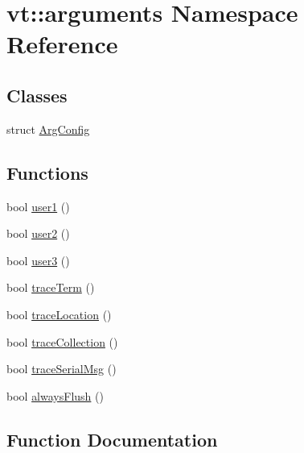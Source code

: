 \hypertarget{namespacevt_1_1arguments}{}\section{vt\+:\+:arguments Namespace Reference}
\label{namespacevt_1_1arguments}
\subsection*{Classes}
\begin{DoxyCompactItemize}
\item 
struct \hyperlink{structvt_1_1arguments_1_1_arg_config}{Arg\+Config}
\end{DoxyCompactItemize}
\subsection*{Functions}
\begin{DoxyCompactItemize}
\item 
bool \hyperlink{namespacevt_1_1arguments_afe229ddf0b473e54fac5ff6884b07ad0}{user1} ()
\item 
bool \hyperlink{namespacevt_1_1arguments_ae58fe1d056c863f7d8103e9c240d17f2}{user2} ()
\item 
bool \hyperlink{namespacevt_1_1arguments_afedf2c9949568b862ec5f8274ef6846b}{user3} ()
\item 
bool \hyperlink{namespacevt_1_1arguments_a60b229dc93c6fce2f24faa8237137a89}{trace\+Term} ()
\item 
bool \hyperlink{namespacevt_1_1arguments_aa49925bcb858fa5bb4779a8e5db3b368}{trace\+Location} ()
\item 
bool \hyperlink{namespacevt_1_1arguments_ae1a1115524b75b6cc64e19968ff16c09}{trace\+Collection} ()
\item 
bool \hyperlink{namespacevt_1_1arguments_ad239f3b085f99c963780dbcb0efd5668}{trace\+Serial\+Msg} ()
\item 
bool \hyperlink{namespacevt_1_1arguments_a6d542414122f93d1b7c6eaa04c3aadfb}{always\+Flush} ()
\end{DoxyCompactItemize}


\subsection{Function Documentation}
\mbox{\label{namespacevt_1_1arguments_a6d542414122f93d1b7c6eaa04c3aadfb}} 
